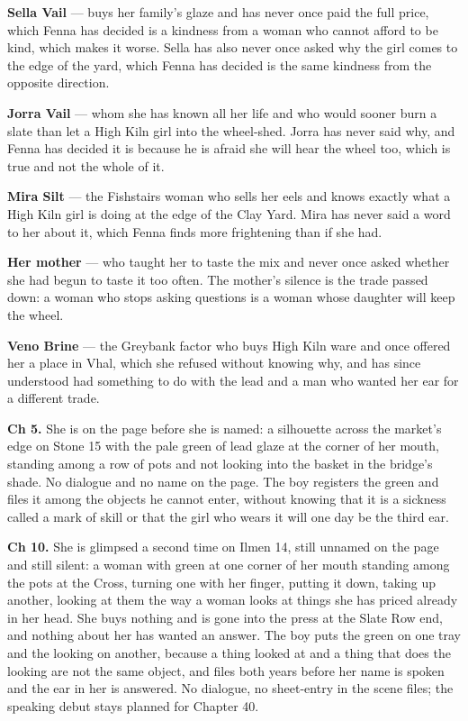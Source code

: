 \documentclass{design/chronicle}
\begin{document}
{\textbf{Sella Vail} — buys her family’s glaze and has never once paid the full price, which Fenna has decided is a kindness from a woman who cannot afford to be kind, which makes it worse. Sella has also never once asked why the girl comes to the edge of the yard, which Fenna has decided is the same kindness from the opposite direction.

\textbf{Jorra Vail} — whom she has known all her life and who would sooner burn a slate than let a High Kiln girl into the wheel-shed. Jorra has never said why, and Fenna has decided it is because he is afraid she will hear the wheel too, which is true and not the whole of it.

\textbf{Mira Silt} — the Fishstairs woman who sells her eels and knows exactly what a High Kiln girl is doing at the edge of the Clay Yard. Mira has never said a word to her about it, which Fenna finds more frightening than if she had.

\textbf{Her mother} — who taught her to taste the mix and never once asked whether she had begun to taste it too often. The mother’s silence is the trade passed down: a woman who stops asking questions is a woman whose daughter will keep the wheel.

\textbf{Veno Brine} — the Greybank factor who buys High Kiln ware and once offered her a place in Vhal, which she refused without knowing why, and has since understood had something to do with the lead and a man who wanted her ear for a different trade.

\textbf{Ch 5.} She is on the page before she is named: a silhouette across the market’s edge on Stone 15 with the pale green of lead glaze at the corner of her mouth, standing among a row of pots and not looking into the basket in the bridge’s shade. No dialogue and no name on the page. The boy registers the green and files it among the objects he cannot enter, without knowing that it is a sickness called a mark of skill or that the girl who wears it will one day be the third ear.

\textbf{Ch 10.} She is glimpsed a second time on Ilmen 14, still unnamed on the page and still silent: a woman with green at one corner of her mouth standing among the pots at the Cross, turning one with her finger, putting it down, taking up another, looking at them the way a woman looks at things she has priced already in her head. She buys nothing and is gone into the press at the Slate Row end, and nothing about her has wanted an answer. The boy puts the green on one tray and the looking on another, because a thing looked at and a thing that does the looking are not the same object, and files both years before her name is spoken and the ear in her is answered. No dialogue, no sheet-entry in the scene files; the speaking debut stays planned for Chapter 40.

}
\end{document}
